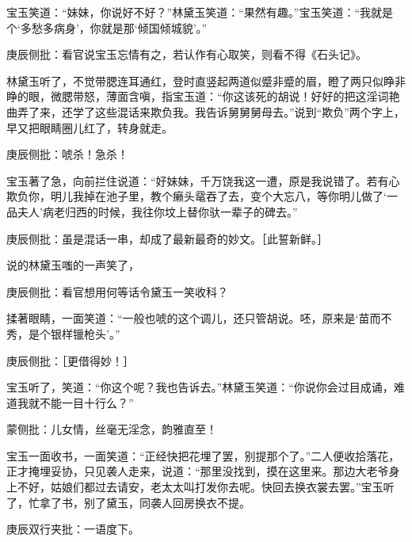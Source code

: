 \begin{parag}
    宝玉笑道：“妹妹，你说好不好？”林黛玉笑道：“果然有趣。”宝玉笑道：“我就是个‘多愁多病身’，你就是那‘倾国倾城貌’。”\begin{note}庚辰侧批：看官说宝玉忘情有之，若认作有心取笑，则看不得《石头记》。\end{note}林黛玉听了，不觉带腮连耳通红，登时直竖起两道似蹙非蹙的眉，瞪了两只似睁非睁的眼，微腮带怒，薄面含嗔，指宝玉道：“你这该死的胡说！好好的把这淫词艳曲弄了来，还学了这些混话来欺负我。我告诉舅舅舅母去。”说到“欺负”两个字上，早又把眼睛圈儿红了，转身就走。\begin{note}庚辰侧批：唬杀！急杀！\end{note}宝玉著了急，向前拦住说道：“好妹妹，千万饶我这一遭，原是我说错了。若有心欺负你，明儿我掉在池子里，教个癞头鼋吞了去，变个大忘八，等你明儿做了‘一品夫人’病老归西的时候，我往你坟上替你驮一辈子的碑去。”\begin{note}庚辰侧批：虽是混话一串，却成了最新最奇的妙文。［此誓新鲜。］\end{note}说的林黛玉嗤的一声笑了，\begin{note}庚辰侧批：看官想用何等话令黛玉一笑收科？\end{note}揉著眼睛，一面笑道：“一般也唬的这个调儿，还只管胡说。呸，原来是‘苗而不秀，是个银样镴枪头’。”\begin{note}庚辰侧批：［更借得妙！］\end{note}宝玉听了，笑道：“你这个呢？我也告诉去。”林黛玉笑道：“你说你会过目成诵，难道我就不能一目十行么？”\begin{note}蒙侧批：儿女情，丝毫无淫念，韵雅直至！\end{note}
\end{parag}


\begin{parag}
    宝玉一面收书，一面笑道：“正经快把花埋了罢，别提那个了。”二人便收拾落花，正才掩埋妥协，只见袭人走来，说道：“那里没找到，摸在这里来。那边大老爷身上不好，姑娘们都过去请安，老太太叫打发你去呢。快回去换衣裳去罢。”宝玉听了，忙拿了书，别了黛玉，同袭人回房换衣不提。\begin{note}庚辰双行夹批：一语度下。\end{note}
\end{parag}


